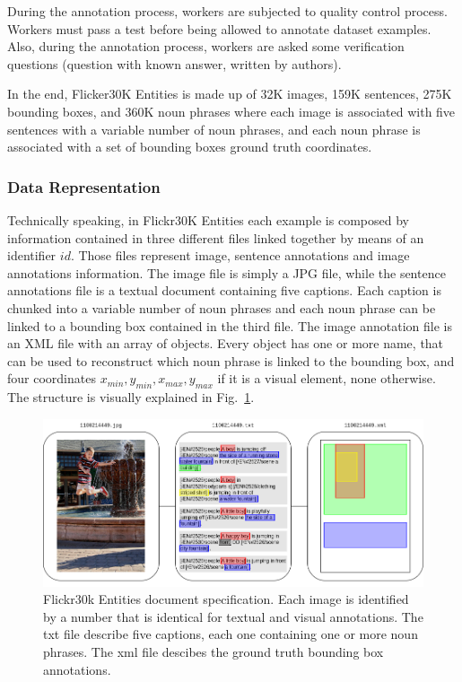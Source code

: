 During the annotation process, workers are subjected to quality
control process. Workers must pass a test before being allowed to
annotate dataset examples. Also, during the annotation process,
workers are asked some verification questions (question with known
answer, written by authors).

In the end, Flicker30K Entities is made up of 32K images, 159K
sentences, 275K bounding boxes, and 360K noun phrases where each image
is associated with five sentences with a variable number of noun
phrases, and each noun phrase is associated with a set of bounding
boxes ground truth coordinates. 

\subsubsection{Data Representation}
\label{subsec:flickr30k-data-representation}

Technically speaking, in Flickr30K Entities each example is composed
by information contained in three different files linked together by
means of an identifier $id$. Those files represent image, sentence
annotations and image annotations information. The image file is
simply a JPG file, while the sentence annotations file is a textual
document containing five captions. Each caption is chunked into a
variable number of noun phrases and each noun phrase can be linked to
a bounding box contained in the third file. The image annotation file
is an XML file with an array of objects. Every object has one or more
name, that can be used to reconstruct which noun phrase is linked to
the bounding box, and four coordinates $x_{min}, y_{min}, x_{max},
y_{max}$ if it is a visual element, none otherwise. The structure is
visually explained in
Fig.~\ref{fig:flickr30k-technical-data-representation}.

\begin{figure}
  \includegraphics[width=\textwidth]{figures/flickr30k-document-specification.png}
  \caption[Flickr30k Entities document specification]{ Flickr30k
    Entities document specification. Each image is identified by a
    number that is identical for textual and visual annotations. The
    txt file describe five captions, each one containing one or more
    noun phrases. The xml file descibes the ground truth bounding box
    annotations. }
  \label{fig:flickr30k-technical-data-representation}
\end{figure}

